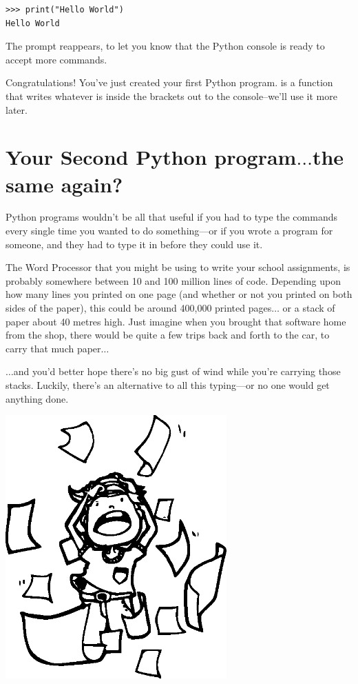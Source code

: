 \begin{listing}
\begin{verbatim}
>>> print("Hello World")
Hello World
\end{verbatim}
\end{listing}

The prompt reappears, to let you know that the Python console is ready to accept more commands.

\noindent
Congratulations! You've just created your first Python program.   is a function that writes whatever is inside the brackets out to the console--we'll use it more later.

\section{Your Second Python program$\ldots$the same again?}

Python programs wouldn't be all that useful if you had to type the commands every single time you wanted to do something---or if you wrote a program for someone, and they had to type it in before they could use it.

The Word Processor that you might be using to write your school assignments, is probably somewhere between 10 and 100 million lines of code.  Depending upon how many lines you printed on one page (and whether or not you printed on both sides of the paper), this could be around 400,000 printed pages$\ldots$ or a stack of paper about 40 metres high.
Just imagine when you brought that software home from the shop, there would be quite a few trips back and forth to the car, to carry that much paper$\ldots$

$\ldots$and you'd better hope there's no big gust of wind while you're carrying those stacks. Luckily, there's an alternative to all this typing---or no one would get anything done.

\begin{center}
\includegraphics*[width=85mm]{eps/pullinghair.eps}
\end{center}

